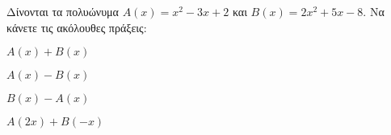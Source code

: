 Δίνονται τα πολυώνυμα $ A(x)=x^2-3x+2 $ και $ B(x)=2x^2+5x-8 $. Να κάνετε τις ακόλουθες πράξεις:
\begin{multicols}{2}
\begin{alist}
\item $ A(x)+B(x) $
\item $ A(x)-B(x) $
\item $ B(x)-A(x) $
\item $ A(2x)+B(-x) $
\end{alist}
\end{multicols}
